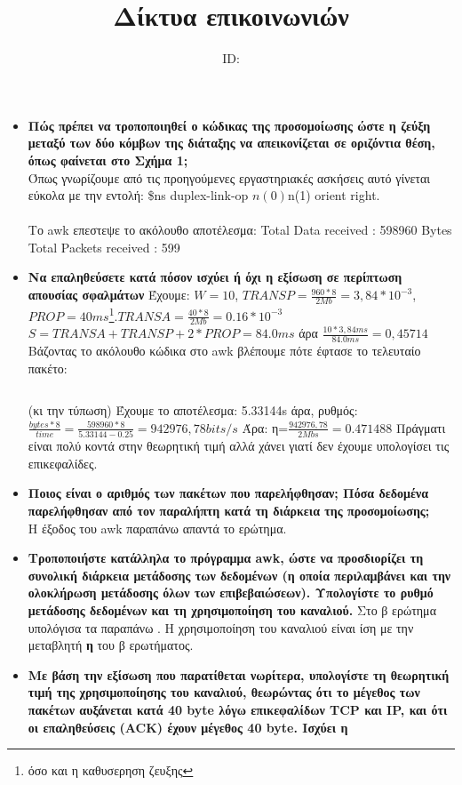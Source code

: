 \documentclass{article}
\title{Δίκτυα επικοινωνιών \\ \exerciseset}
\author{\studentname \qquad  ID: \suid}
\begin{document}
\maketitle
\begin{itemize}
	\item \textbf{Πώς πρέπει να τροποποιηθεί ο κώδικας της προσομοίωσης ώστε η ζεύξη μεταξύ των δύο κόμβων
		της διάταξης να απεικονίζεται σε οριζόντια θέση, όπως φαίνεται στο Σχήμα 1; } \\ Όπως γνωρίζουμε από τις προηγούμενες εργαστηριακές ασκήσεις αυτό γίνεται εύκολα με την εντολή:
	\$ns duplex-link-op $n(0) $n(1) orient right.\\ \\
	Το awk επεστεψε το ακόλουθο αποτέλεσμα:
	Total Data received	: 598960 Bytes\\
	Total Packets received	: 599
	\item \textbf{Να επαληθεύσετε κατά πόσον ισχύει ή όχι η εξίσωση σε περίπτωση απουσίας σφαλμάτων}
	Έχουμε:
	$W=10$, $TRANSP=\frac{960*8}{2Mb}=3,84*10^{-3}$,$PROP=40ms$\footnote{ όσο και η καθυσερηση ζευξης}.$TRANSA = \frac{40*8}{2Mb}=0.16*10^{-3}$
	$S=TRANSA+TRANSP +2*PROP=84.0ms$ άρα $\frac{10*3,84ms}{84.0ms}=0,45714$
	Βάζοντας το ακόλουθο κώδικα στο awk βλέπουμε πότε έφτασε το τελευταίο πακέτο: \inputminted[firstline=10,lastline=11]{awk}{lab5.awk}  (κι την τύπωση)
	Έχουμε το αποτέλεσμα: 5.33144s άρα, ρυθμός:$\frac{bytes*8}{time}=\frac{598960*8}{5.33144-0.25}=942976,78bits/s$ Άρα: η=$\frac{942976,78}{2Mbs}=0.471488$ Πράγματι είναι πολύ κοντά στην θεωρητική τιμή αλλά χάνει γιατί δεν έχουμε υπολογίσει τις επικεφαλίδες.
	\item \textbf{Ποιος είναι ο αριθμός των πακέτων που παρελήφθησαν; Πόσα δεδομένα παρελήφθησαν από τον
		παραλήπτη κατά τη διάρκεια της προσομοίωσης; } \\Η έξοδος του awk παραπάνω απαντά το ερώτημα.
		\item \textbf{ Τροποποιήστε κατάλληλα το πρόγραμμα awk, ώστε να προσδιορίζει τη συνολική διάρκεια
			μετάδοσης των δεδομένων (η οποία περιλαμβάνει και την ολοκλήρωση μετάδοσης όλων των
			επιβεβαιώσεων). Υπολογίστε το ρυθμό μετάδοσης δεδομένων και τη χρησιμοποίηση του καναλιού. } Στο β ερώτημα υπολόγισα τα παραπάνω . 
		Η χρησιμοποίηση του καναλιού είναι ίση με την μεταβλητή \textbf{η} του β ερωτήματος.
		\item \textbf{Με βάση την εξίσωση που παρατίθεται νωρίτερα, υπολογίστε τη θεωρητική τιμή της
			χρησιμοποίησης του καναλιού, θεωρώντας ότι το μέγεθος των πακέτων αυξάνεται κατά 40 byte
			λόγω επικεφαλίδων TCP και IP, και ότι οι επαληθεύσεις (ACK) έχουν μέγεθος 40 byte. Ισχύει η
}
\end{itemize}
\end{document}
